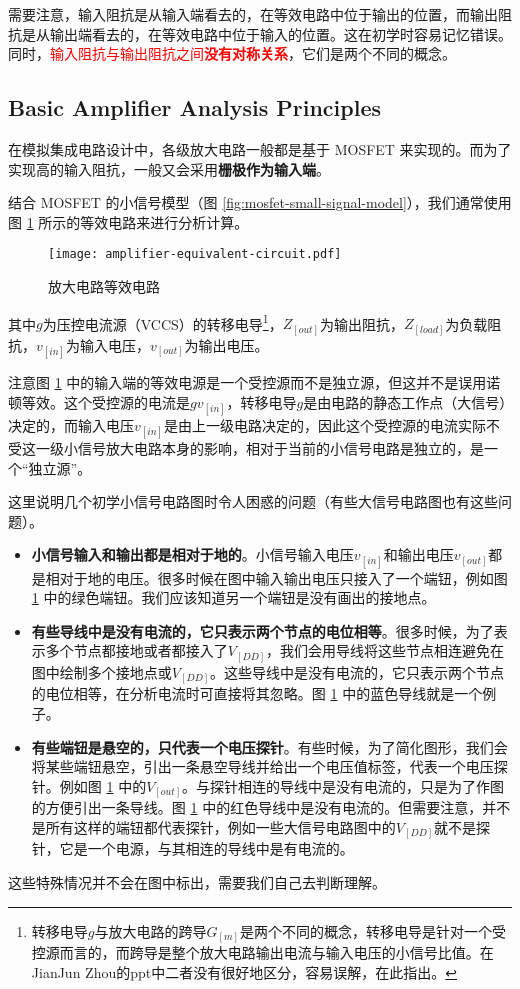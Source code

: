 需要注意，输入阻抗是从输入端看去的，在等效电路中位于输出的位置，而输出阻抗是从输出端看去的，在等效电路中位于输入的位置。这在初学时容易记忆错误。
同时，\textcolor{red}{输入阻抗与输出阻抗之间\textbf{没有对称关系}}，它们是两个不同的概念。

\subsection{Basic Amplifier Analysis Principles}
在模拟集成电路设计中，各级放大电路一般都是基于 MOSFET 来实现的。而为了实现高的输入阻抗，一般又会采用\textbf{栅极作为输入端}。

结合 MOSFET 的小信号模型（图 \ref{fig:mosfet-small-signal-model}），我们通常使用图 \ref{fig:amplifier-equivalent-circuit} 所示的等效电路来进行分析计算。
\begin{figure}[h!tb]
    \centering
    \texttt{[image: amplifier-equivalent-circuit.pdf]}
    \caption{放大电路等效电路}
    \label{fig:amplifier-equivalent-circuit}
\end{figure}
其中$g$为压控电流源（VCCS）的转移电导\footnote{转移电导$g$与放大电路的跨导$G_[m]$是两个不同的概念，转移电导是针对一个受控源而言的，而跨导是整个放大电路输出电流与输入电压的小信号比值。在JianJun Zhou的ppt中二者没有很好地区分，容易误解，在此指出。}，$Z_[out]$为输出阻抗，$Z_[load]$为负载阻抗，$v_[in]$为输入电压，$v_[out]$为输出电压。

注意图 \ref{fig:amplifier-equivalent-circuit} 中的输入端的等效电源是一个受控源而不是独立源，但这并不是误用诺顿等效。这个受控源的电流是$g v_[in]$，转移电导$g$是由电路的静态工作点（大信号）决定的，而输入电压$v_[in]$是由上一级电路决定的，因此这个受控源的电流实际不受这一级小信号放大电路本身的影响，相对于当前的小信号电路是独立的，是一个“独立源”。

这里说明几个初学小信号电路图时令人困惑的问题（有些大信号电路图也有这些问题）。
\begin{itemize}
    \item \textbf{小信号输入和输出都是相对于地的}。小信号输入电压$v_[in]$和输出电压$v_[out]$都是相对于地的电压。很多时候在图中输入输出电压只接入了一个端钮，例如图 \ref{fig:amplifier-equivalent-circuit} 中的绿色端钮。我们应该知道另一个端钮是没有画出的接地点。

    \item \textbf{有些导线中是没有电流的，它只表示两个节点的电位相等}。很多时候，为了表示多个节点都接地或者都接入了$V_[DD]$，我们会用导线将这些节点相连避免在图中绘制多个接地点或$V_[DD]$。这些导线中是没有电流的，它只表示两个节点的电位相等，在分析电流时可直接将其忽略。图 \ref{fig:amplifier-equivalent-circuit} 中的蓝色导线就是一个例子。

    \item \textbf{有些端钮是悬空的，只代表一个电压探针}。有些时候，为了简化图形，我们会将某些端钮悬空，引出一条悬空导线并给出一个电压值标签，代表一个电压探针。例如图 \ref{fig:amplifier-equivalent-circuit} 中的$V_[out]$。与探针相连的导线中是没有电流的，只是为了作图的方便引出一条导线。图 \ref{fig:amplifier-equivalent-circuit} 中的红色导线中是没有电流的。但需要注意，并不是所有这样的端钮都代表探针，例如一些大信号电路图中的$V_[DD]$就不是探针，它是一个电源，与其相连的导线中是有电流的。
\end{itemize}
这些特殊情况并不会在图中标出，需要我们自己去判断理解。

